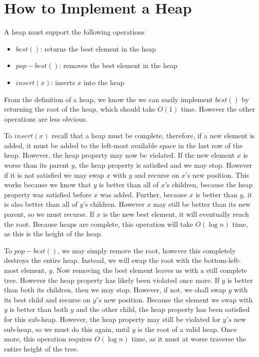 \section{How to Implement a Heap}

A heap must support the following operations

\begin{itemize}
\item $best()$: returns the best element in the heap
\item $pop-best()$: removes the best element in the heap
\item $insert(x)$: inserts $x$ into the heap
\end{itemize}

From the definition of a heap, we know the we can easily implement
$best()$ by returning the root of the heap, which should take $O(1)$
time.  However the other operations are less obvious.

To $insert(x)$ recall that a heap must be complete, therefore, if a
new element is added, it must be added to the left-most available
space in the last row of the heap. However, the heap property may now
be violated.  If the new element $x$ is worse than its parent $y$, the
heap property is satisfied and we may stop. However if it is not
satisfied we may swap $x$ with $y$ and recurse on $x$'s new
position. This works because we know that $y$ is better than all of
$x$'s children, because the heap property was satisfied before $x$ was
added. Further, because $x$ is better than $y$, it is also better than
all of $y$'s children. However $x$ may still be better than its new
parent, so we must recurse. If $x$ is the new best element, it will
eventually reach the root. Because heaps are complete, this operation
will take $O(\log n)$ time, as this is the height of the heap.

To $pop-best()$, we may simply remove the root, however this
completely destroys the entire heap. Instead, we will swap the root
with the bottom-left-most element, $y$. Now removing the best element
leaves us with a still complete tree. However the heap property has
likely been violated once more. If $y$ is better than both its
children, then we may stop. However, if not, we shall swap $y$ with
its best child and recurse on $y's$ new position. Because the element
we swap with $y$ is better than both $y$ and the other child, the heap
property has been satisfied for this sub-heap. However, the heap
property may still be violated for $y's$ new sub-heap, so we must do
this again, until $y$ is the root of a valid heap. Once more, this
operation requires $O(\log n)$ time, as it must at worse traverse the
entire height of the tree.


